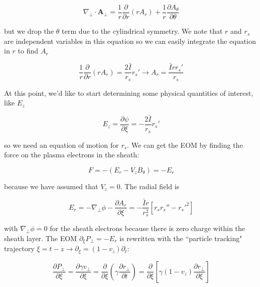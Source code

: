 \documentclass[aps,prl,preprint,groupedaddress]{revtex4-1}
\begin{document}
\begin{equation}\label{eq:a_perp_cyl}
\nabla_\perp \cdot \mathbf{A}_\perp = \frac{1}{r}\frac{\partial}{\partial r} (r A_r) + \frac{1}{r}\frac{\partial A_{\theta}}{\partial \theta}
\end{equation}

but we drop the $\theta$ term due to the cylindrical symmetry. We note that $r$ and $r_s$ are independent variables in this equation so we can easily integrate the equation in $r$ to find $A_r$

\begin{equation}\label{eq:a_r}
\frac{1}{r}\frac{\partial}{\partial r} (r A_r) = \frac{2\bar{I}}{r_s}r_s' \rightarrow A_r = \frac{\bar{I} r r_s'}{r_s}
\end{equation}

At this point, we'd like to start determining some physical quantities of interest, like $E_z$

\begin{equation}\label{eq:E_z}
E_z = \frac{\partial \psi}{\partial \xi} = -\frac{2\bar{I}}{r_s}r_s'
\end{equation}

so we need an equation of motion for $r_s$. We can get the EOM by finding the force on the plasma electrons in the sheath:

\begin{equation}\label{eq:force}
F =-(E_r -V_z B_{\theta}) = -E_r
\end{equation}

because we have assumed that $V_z = 0$. The radial field is

\begin{equation}\label{eq:force}
E_r =-\nabla_{\perp} \phi - \frac{\partial A_r}{\partial \xi} = -\frac{\bar{I} r}{r_s^2}[r_s r_s'' - r_s'^2]
\end{equation}

with $\nabla_{\perp} \phi = 0$ for the sheath electrons because there is zero charge within the sheath layer. The EOM $\partial_{\xi} P_{\perp} = -E_r$ is rewritten with the ``particle tracking" trajectory $\xi = t - z \rightarrow \partial_{\xi} = (1-v_z)\partial_t$:

\begin{equation}\label{eq:track}
\frac{\partial P_{\perp}}{\partial \xi} = \frac{\partial \gamma v_{\perp}}{\partial \xi} =  \frac{\partial}{\partial \xi}\left(\gamma \frac{\partial r_{\perp}}{\partial t}\right) = \frac{\partial}{\partial \xi}\left[\gamma (1-v_z)\frac{\partial r_{\perp}}{\partial \xi}\right]
\end{equation}
\end{document}
